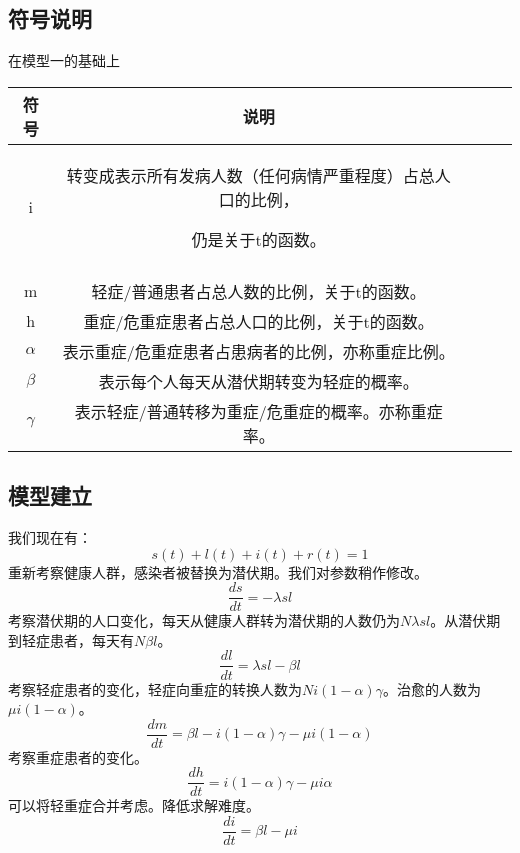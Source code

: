 \documentclass[withoutpreface,bwprint]{cumcmthesis} %
\begin{document}
\subsection{符号说明}
在模型一的基础上
    \begin{table}[!htbp]
       \label{tab:002}
       \centering
        \begin{tabular}{ccccc}
            \toprule[1.5pt]
            符号 & 说明 \\
            \midrule[1pt]
             i& 转变成表示所有发病人数（任何病情严重程度）占总人口的比例，

                仍是关于t的函数。\\
             \\
             m& 轻症/普通患者占总人数的比例，关于t的函数。\\
             h& 重症/危重症患者占总人口的比例，关于t的函数。\\
             $\alpha $ & 表示重症/危重症患者占患病者的比例，亦称重症比例。\\
             $\beta $ & 表示每个人每天从潜伏期转变为轻症的概率。\\
             $\gamma $ & 表示轻症/普通转移为重症/危重症的概率。亦称重症率。\\
            \bottomrule[1.5pt]
        \end{tabular}
    \end{table}

\subsection{模型建立}
我们现在有：
    \begin{equation}\label{qua:006}
        s\left(t\right)+l\left(t\right)+i(t)+r(t)=1
    \end{equation}
重新考察健康人群，感染者被替换为潜伏期。我们对参数稍作修改。
    \begin{equation}\label{qua:007}
      \frac{ds}{dt}=-\lambda sl
    \end{equation}
考察潜伏期的人口变化，每天从健康人群转为潜伏期的人数仍为\textit{$N\lambda sl$}。从潜伏期到轻症患者，每天有\textit{$N\beta l$}。
    \begin{equation}\label{qua:008}
      \frac{dl}{dt}=\lambda sl-\beta l
    \end{equation}
考察轻症患者的变化，轻症向重症的转换人数为\textit{$Ni(1-\alpha)\gamma $}。治愈的人数为\textit{$\mu i(1-\alpha) $}。
    \begin{equation}\label{qua:009}
        \frac{dm}{dt}=\beta l-i(1-\alpha)\gamma-\mu i(1-\alpha)
    \end{equation}
考察重症患者的变化。
    \begin{equation}\label{qua:010}
        \frac{dh}{dt}=i(1-\alpha)\gamma-\mu i\alpha
    \end{equation}
可以将轻重症合并考虑。降低求解难度。
    \begin{equation}\label{qua:011}
        \frac{di}{dt}=\beta l-\mu i
    \end{equation}
\end{document}
